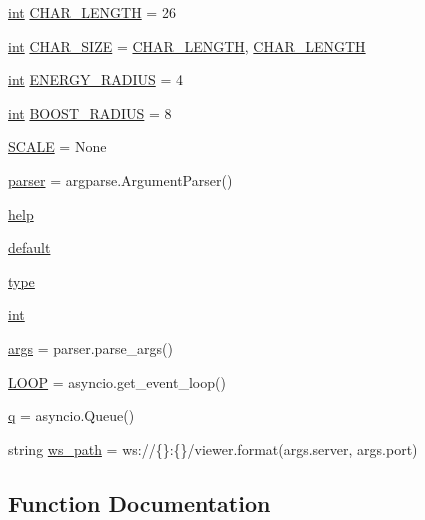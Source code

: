 \begin{DoxyCompactItemize}
\item 
\hyperlink{namespaceviewer_ad9bf277fee851c5eadd676fe6f1a24e8}{int} \hyperlink{namespaceviewer_a3086f1a9ab26e199f7f0b53f1fd0443f}{C\+H\+A\+R\+\_\+\+L\+E\+N\+G\+TH} = 26
\item 
\hyperlink{namespaceviewer_ad9bf277fee851c5eadd676fe6f1a24e8}{int} \hyperlink{namespaceviewer_ae24d498ff64ab3cc41406c591e58c0dd}{C\+H\+A\+R\+\_\+\+S\+I\+ZE} = \hyperlink{namespaceviewer_a3086f1a9ab26e199f7f0b53f1fd0443f}{C\+H\+A\+R\+\_\+\+L\+E\+N\+G\+TH}, \hyperlink{namespaceviewer_a3086f1a9ab26e199f7f0b53f1fd0443f}{C\+H\+A\+R\+\_\+\+L\+E\+N\+G\+TH}
\item 
\hyperlink{namespaceviewer_ad9bf277fee851c5eadd676fe6f1a24e8}{int} \hyperlink{namespaceviewer_ad5e2ff3c34674b67764a31dc0ba5a1c4}{E\+N\+E\+R\+G\+Y\+\_\+\+R\+A\+D\+I\+US} = 4
\item 
\hyperlink{namespaceviewer_ad9bf277fee851c5eadd676fe6f1a24e8}{int} \hyperlink{namespaceviewer_ab4d3ff3e9dd13bedd3897c4871c927ad}{B\+O\+O\+S\+T\+\_\+\+R\+A\+D\+I\+US} = 8
\item 
\hyperlink{namespaceviewer_a33982a3fdf16022861ad8227ed375a3f}{S\+C\+A\+LE} = None
\item 
\hyperlink{namespaceviewer_a40cdbd0d97e7e53fe61800e7e504e763}{parser} = argparse.\+Argument\+Parser()
\item 
\hyperlink{namespaceviewer_a4519b0a4a06be2d506044dbada863c7e}{help}
\item 
\hyperlink{namespaceviewer_af9634fd9573f0f29bdd7856c3b61decc}{default}
\item 
\hyperlink{namespaceviewer_aae395bb4d0ce7a287019769e4ed6e603}{type}
\item 
\hyperlink{namespaceviewer_ad9bf277fee851c5eadd676fe6f1a24e8}{int}
\item 
\hyperlink{namespaceviewer_ae4c74d58aa55cd0c26a4f9113529f1bf}{args} = parser.\+parse\+\_\+args()
\item 
\hyperlink{namespaceviewer_a660bbde5965f91becad747868e409c6c}{L\+O\+OP} = asyncio.\+get\+\_\+event\+\_\+loop()
\item 
\hyperlink{namespaceviewer_a1f452bb9e64e242ae0cf6089e85cf1ca}{q} = asyncio.\+Queue()
\item 
string \hyperlink{namespaceviewer_aa3b7314e33c7838d36b05e751690ea1b}{ws\+\_\+path} = \textquotesingle{}ws\+://\{\}\+:\{\}/viewer\textquotesingle{}.format(args.\+server, args.\+port)
\end{DoxyCompactItemize}


\subsection{Function Documentation}
\mbox{\label{namespaceviewer_abc882e9f90b892fa6984e88c1a387920}} 
